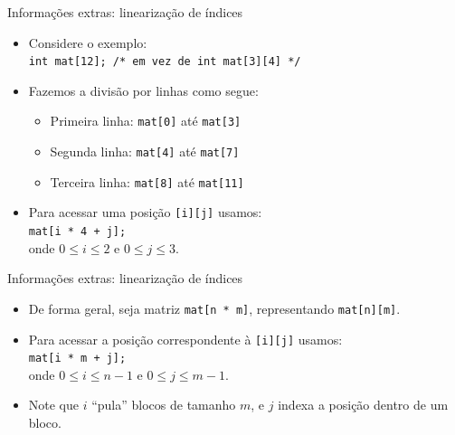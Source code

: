 \documentclass[handout]{beamer}
\newcommand{\cod}[1]{\texttt{#1}}
\begin{document}
\begin{frame}[fragile]{Informações extras: linearização de índices}

    \begin{itemize}
        \item Considere o exemplo:\\
            \cod{int mat[12]; /* em vez de int mat[3][4] */}
        \item Fazemos a divisão por linhas como segue:
        \begin{itemize}
            \item Primeira linha: \cod{mat[0]} até \cod{mat[3]}
            \item Segunda linha: \cod{mat[4]} até \cod{mat[7]}
            \item Terceira linha: \cod{mat[8]} até \cod{mat[11]}
        \end{itemize}
        \item Para acessar uma posição \cod{[i][j]} usamos:\\
            \cod{mat[i * 4 + j];}\\
            onde $0 \le i \le 2$ e $0 \le j \le 3$.
    \end{itemize}

\end{frame}

\begin{frame}[fragile]{Informações extras: linearização de índices}

    \begin{itemize}
        \item De forma geral, seja matriz \cod{mat[n * m]}, representando \cod{mat[n][m]}.
        \item Para acessar a posição correspondente à \cod{[i][j]} usamos:\\
            \cod{mat[i * m + j];}\\
            onde $0 \le i \le n-1$  e $0 \le j \le m-1$.
        \item Note que $i$ ``pula'' blocos de tamanho $m$, e $j$ indexa a posição dentro de um bloco.
    \end{itemize}

\end{frame}
\end{document}
